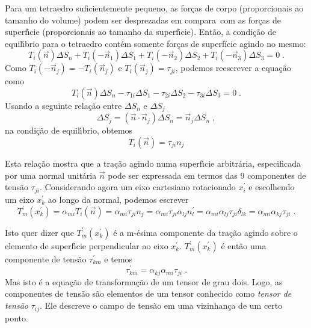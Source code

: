 Para um tetraedro suficientemente pequeno, as
for\c{c}as de corpo (proporcionais ao tamanho do volume) podem ser
desprezadas em compara\cao\ com as for\c{c}as de superf\'{\i}cie
(proporcionais ao tamanho da superf\'{\i}cie). Ent\~ao, a
condi\c{c}\~ao de equil\'{\i}brio para o tetraedro cont\'em somente
for\c{c}as de superf\'icie agindo no mesmo:
\begin{equation}
T_i(\vec{n}) \Delta S_n + T_i(-\vec{n}_1) \Delta S_1 +
T_i(-\vec{n}_2) \Delta S_2 + T_i(-\vec{n}_3) \Delta S_3 = 0 \;.
\end{equation}
Como $T_i(-\vec{n}_j)=-T_i(\vec{n}_j)$ e
$T_i(\vec{n}_j)=\tau_{ji}$, podemos reescrever a equa\c{c}\~ao
como
\begin{equation}
T_i(\vec{n}) \Delta S_n - \tau_{1i} \Delta S_1 - \tau_{2i} \Delta
S_2 - \tau_{3i} \Delta S_3 = 0 \;.
\end{equation}
Usando a seguinte rela\c{c}\~ao entre $\Delta S_n$ e $\Delta S_j$
\begin{equation}
\Delta S_j= (\vec{n} \cdot \vec{n}_j) \Delta S_n = \vec {n}_j \Delta S_n \;,
\end{equation}
na condi\c{c}\~ao de equil\'{\i}brio, obtemos
\begin{equation}
T_i(\vec{n}) = \tau_{ji} n_j \label{cond_equil}
\end{equation}


Esta rela\c{c}\~ao mostra que a tra\c{c}\~ao agindo numa
superf\'{\i}cie arbitr\'aria, especificada por uma normal
unit\'aria $\vec{n}$ pode ser expressada em termos das 9
componentes de tens\~ao $\tau_{ji}$. Considerando agora um  eixo
cartesiano rotacionado $x^{'}_i$ e escolhendo um eixo $x^{'}_k$ ao
longo da normal, podemos escrever
\begin{equation}
T^{'}_m(x^{'}_k) = \alpha_{mi} T_i(\vec{n}) = \alpha_{mi}
\tau_{ji} n_j = \alpha_{mi} \tau_{ji} \alpha_{lj} n^{'}_l =
\alpha_{mi} \alpha_{lj} \tau_{ji} \delta_{lk} = \alpha_{mi}
\alpha_{kj} \tau_{ji} \;.
\end{equation}

Isto quer dizer que $T^{'}_m(x^{'}_k)$ \'e a m-\'esima componente
da tra\c{c}\~ao agindo sobre o elemento de superf\'{\i}cie
perpendicular ao eixo $x^{'}_k$. $T^{'}_m(x^{'}_k)$ \'e ent\~ao
uma componente de tens\~ao $\tau^{'}_{km}$ e temos
\begin{equation}
\tau^{'}_{km} = \alpha_{kj} \alpha_{mi} \tau_{ji} \;.
\end{equation}
Mas isto \'e a equa\c{c}\~ao de transforma\c{c}\~ao de um tensor
de grau dois. Logo, as componentes de tens\~ao s\~ao elementos de
um tensor conhecido como {\it tensor de tens\~ao} $\tau_{ij}$.
Ele descreve o campo de tens\~ao em uma vizinhan\c{c}a de um certo ponto.





